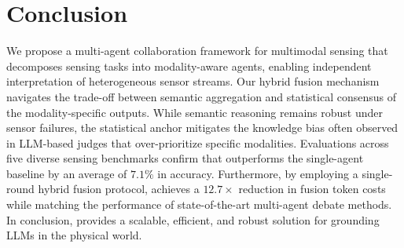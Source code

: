 \section{Conclusion}
\label{sec:conclusion}

We propose a multi-agent collaboration framework for multimodal sensing that decomposes sensing tasks into modality-aware agents, enabling independent interpretation of heterogeneous sensor streams. Our hybrid fusion mechanism navigates the trade-off between semantic aggregation and statistical consensus of the modality-specific outputs. While semantic reasoning remains robust under sensor failures, the statistical anchor mitigates the knowledge bias often observed in LLM-based judges that over-prioritize specific modalities. Evaluations across five diverse sensing benchmarks confirm that \system{} outperforms the single-agent baseline by an average of $7.1\%$ in accuracy. Furthermore, by employing a single-round hybrid fusion protocol, \system{} achieves a $12.7\times$ reduction in fusion token costs while matching the performance of state-of-the-art multi-agent debate methods. In conclusion, \system{} provides a scalable, efficient, and robust solution for grounding LLMs in the physical world.
